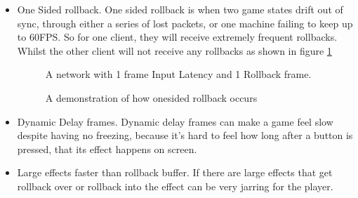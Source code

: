 \documentclass{entcs}
\begin{document}
\begin{itemize}
\item One Sided rollback. \cite{SFV 1}  \cite{SFV 2} \cite {SFV 3}
One sided rollback is when two game states drift out of sync, through either a series of lost packets, or one machine failing to keep up to 60FPS. So for one client, they will receive extremely frequent rollbacks. Whilst the other client will not receive any rollbacks as shown in figure \ref{fig:OneSided}
\begin{figure}[h]
A network with 1 frame Input Latency and 1 Rollback frame.
\caption{A demonstration of how onesided rollback occurs}
\label{fig:OneSided}
\end{figure}
\item Dynamic Delay frames. \cite{SFV 1}
Dynamic delay frames can make a game feel slow despite having no freezing, because it's hard to feel how long after a button is pressed, that its effect happens on screen.
\item Large effects faster than rollback buffer. \cite{SFV 1}
If there are large effects that get rollback over or rollback into the effect can be very jarring for the player.
\end{itemize}
\end{document}
